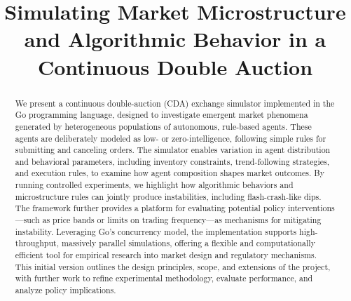 \documentclass[conference, 12pt]{IEEEtran}
\begin{document}
\title{
Simulating Market Microstructure and Algorithmic Behavior in a Continuous Double Auction
}

\author{






}



\maketitle



\begin{abstract}
We present a continuous double-auction (CDA) exchange simulator implemented in the Go programming language, designed to investigate emergent market phenomena generated by heterogeneous populations of autonomous, rule-based agents. These agents are deliberately modeled as low- or zero-intelligence, following simple rules for submitting and canceling orders. The simulator enables variation in agent distribution and behavioral parameters, including inventory constraints, trend-following strategies, and execution rules, to examine how agent composition shapes market outcomes. By running controlled experiments, we highlight how algorithmic behaviors and microstructure rules can jointly produce instabilities, including flash-crash-like dips. The framework further provides a platform for evaluating potential policy interventions—such as price bands or limits on trading frequency—as mechanisms for mitigating instability. Leveraging Go’s concurrency model, the implementation supports high-throughput, massively parallel simulations, offering a flexible and computationally efficient tool for empirical research into market design and regulatory mechanisms. This initial version outlines the design principles, scope, and extensions of the project, with further work to refine experimental methodology, evaluate performance, and analyze policy implications.
\end{abstract}
\end{document}
